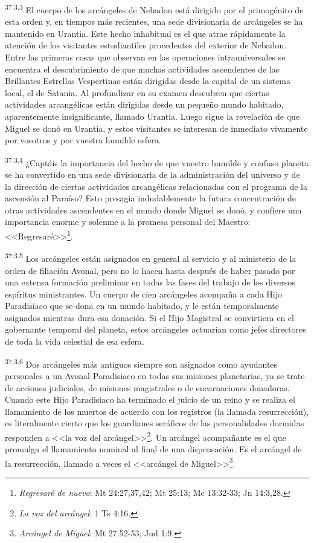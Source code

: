 \par
\textsuperscript{37:3.3} El cuerpo de los arcángeles de Nebadon está dirigido por el primogénito de esta orden y, en tiempos más recientes, una sede divisionaria de arcángeles se ha mantenido en Urantia. Este hecho inhabitual es el que atrae rápidamente la atención de los visitantes estudiantiles procedentes del exterior de Nebadon. Entre las primeras cosas que observan en las operaciones intrauniversales se encuentra el descubrimiento de que muchas actividades ascendentes de las Brillantes Estrellas Vespertinas están dirigidas desde la capital de un sistema local, el de Satania. Al profundizar en su examen descubren que ciertas actividades arcangélicas están dirigidas desde un pequeño mundo habitado, aparentemente insignificante, llamado Urantia. Luego sigue la revelación de que Miguel se donó en Urantia, y estos visitantes se interesan de inmediato vivamente por vosotros y por vuestra humilde esfera.

\par
\textsuperscript{37:3.4} ¿Captáis la importancia del hecho de que vuestro humilde y confuso planeta se ha convertido en una sede divisionaria de la administración del universo y de la dirección de ciertas actividades arcangélicas relacionadas con el programa de la ascensión al Paraíso? Esto presagia indudablemente la futura concentración de otras actividades ascendentes en el mundo donde Miguel se donó, y confiere una importancia enorme y solemne a la promesa personal del Maestro: <<Regresaré>>\footnote{\textit{Regresaré de nuevo}: Mt 24:27,37,42; Mt 25:13; Mc 13:32-33; Jn 14:3,28.}.

\par
\textsuperscript{37:3.5} Los arcángeles están asignados en general al servicio y al ministerio de la orden de filiación Avonal, pero no lo hacen hasta después de haber pasado por una extensa formación preliminar en todas las fases del trabajo de los diversos espíritus ministrantes. Un cuerpo de cien arcángeles acompaña a cada Hijo Paradisiaco que se dona en un mundo habitado, y le están temporalmente asignados mientras dura esa donación. Si el Hijo Magistral se convirtiera en el gobernante temporal del planeta, estos arcángeles actuarían como jefes directores de toda la vida celestial de esa esfera.

\par
\textsuperscript{37:3.6} Dos arcángeles más antiguos siempre son asignados como ayudantes personales a un Avonal Paradisiaco en todas sus misiones planetarias, ya se trate de acciones judiciales, de misiones magistrales o de encarnaciones donadoras. Cuando este Hijo Paradisiaco ha terminado el juicio de un reino y se realiza el llamamiento de los muertos de acuerdo con los registros (la llamada resurrección), es literalmente cierto que los guardianes seráficos de las personalidades dormidas responden a <<la voz del arcángel>>\footnote{\textit{La voz del arcángel}: 1 Ts 4:16.}. Un arcángel acompañante es el que promulga el llamamiento nominal al final de una dispensación. Es el arcángel de la resurrección, llamado a veces el <<arcángel de Miguel>>\footnote{\textit{Arcángel de Miguel}: Mt 27:52-53; Jud 1:9.}.

